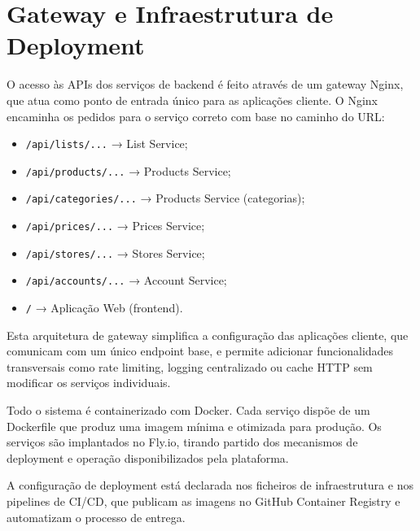 \section{Gateway e Infraestrutura de Deployment}
\label{sec:4.8}

O acesso às APIs dos serviços de backend é feito através de um gateway Nginx, que atua como ponto de entrada único para as aplicações cliente. O Nginx encaminha os pedidos para o serviço correto com base no caminho do URL:

\begin{itemize}
    \item \texttt{/api/lists/...} → List Service;
    \item \texttt{/api/products/...} → Products Service;
    \item \texttt{/api/categories/...} → Products Service (categorias);
    \item \texttt{/api/prices/...} → Prices Service;
    \item \texttt{/api/stores/...} → Stores Service;
    \item \texttt{/api/accounts/...} → Account Service;
    \item \texttt{/} → Aplicação Web (frontend).
\end{itemize}

Esta arquitetura de gateway simplifica a configuração das aplicações cliente, que comunicam com um único endpoint base, e permite adicionar funcionalidades transversais como rate limiting, logging centralizado ou cache HTTP sem modificar os serviços individuais.

Todo o sistema é containerizado com Docker. Cada serviço dispõe de um Dockerfile que produz uma imagem mínima e otimizada para produção. Os serviços são implantados no Fly.io, tirando partido dos mecanismos de deployment e operação disponibilizados pela plataforma.

A configuração de deployment está declarada nos ficheiros de infraestrutura e nos pipelines de \ac{CI/CD}, que publicam as imagens no GitHub Container Registry e automatizam o processo de entrega.
